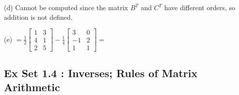 \documentclass[addpoints]{exam}
\begin{document}
\begin{questions}
\begin{solution}
        (d) Cannot be computed since the matrix $ B^T $ and $ C^T $ have different orders, so addition is not defined.

        (e) $ = \frac{1}{2}\begin{bmatrix}
            1 & 3 \\ 4 & 1 \\ 2 & 5
        \end{bmatrix} -\frac{1}{4}\begin{bmatrix}
            3 & 0 \\ -1 & 2 \\ 1 & 1
        \end{bmatrix} = $
    \end{solution}
\end{questions}


\subsection*{\textbf{Ex Set 1.4 : Inverses; Rules of Matrix Arithmetic}}
\end{document}
